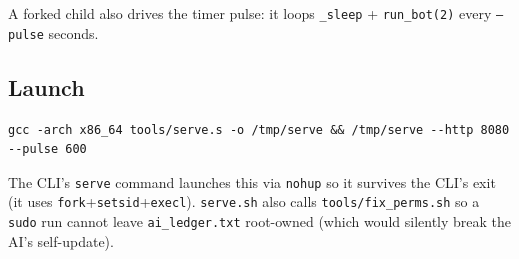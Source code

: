 A forked child also drives the timer pulse: it loops
\texttt{\_sleep} + \texttt{run\_bot(2)} every \texttt{--pulse} seconds.

\subsection{Launch}

\begin{verbatim}
gcc -arch x86_64 tools/serve.s -o /tmp/serve && /tmp/serve --http 8080 --pulse 600
\end{verbatim}

The CLI's \texttt{serve} command launches this via \texttt{nohup} so it
survives the CLI's exit (it uses \texttt{fork}+\texttt{setsid}+\texttt{execl}).
\texttt{serve.sh} also calls \texttt{tools/fix\_perms.sh} so a \texttt{sudo}
run cannot leave \texttt{ai\_ledger.txt} root-owned (which would silently
break the AI's self-update).
